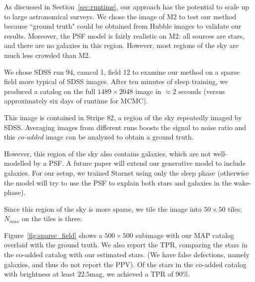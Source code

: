 As discussed in Section~\ref{sec:runtime}, our approach has the potential 
to scale up to large astronomical surveys. We chose the image of M2 to test our method because ``ground truth" could be obtained from Hubble images to validate our results. Moreover, 
the PSF model is fairly realistic on M2: all sources are 
stars, and there are no galaxies in this region. 
However, most regions of the sky are much less 
crowded than M2.


We chose SDSS run 94, camcol 1, field  12 to examine our method on a sparse field more typical of SDSS 
images. After ten minutes of sleep training, we produced a catalog on the full $1489\times 2048$ image in $\approx2$ seconds (versus approximately six days of runtime for MCMC). 

This image is contained in Stripe 82, a region of the sky repeatedly imaged by SDSS. Averaging images from different runs boosts the signal to noise ratio and this {\itshape co-added} image can be analyzed to obtain a ground truth. 

However, this region of the sky also contains galaxies, which are 
not well-modelled by a PSF. A future paper will extend our generative model to include galaxies. For our setup, we trained Starnet using only the sleep phase (otherwise the model will try to use the PSF to explain both stars and galaxies in the wake-phase). 

Since this region of the sky is more sparse, we tile the image into $50\times 50$ tiles; $N_{max}$ on the tiles is three. 

Figure~\ref{fig:sparse_field} shows a $500\times 500$ subimage with 
our MAP catalog overlaid with the ground truth. We also report the 
TPR, comparing the stars in the co-added catalog with our estimated stars. (We have false defections, namely galaxies, and thus 
do not report the PPV). Of the stars in the co-added catalog with brightness at least $22.5$mag, we achieved a TPR of 90\%. 



